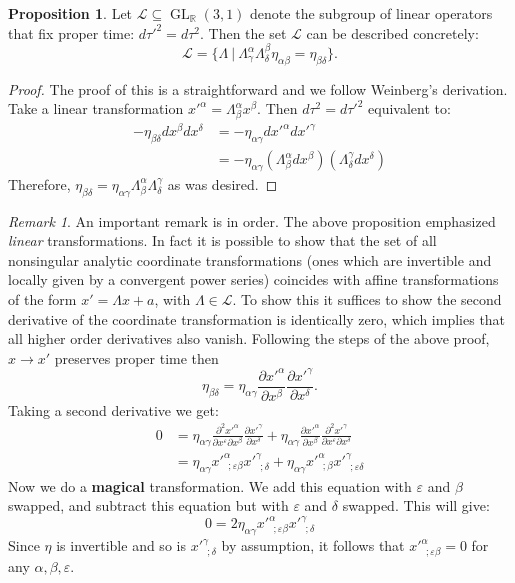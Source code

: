 \documentclass[11pt]{report}
\newcommand{\RR}{\mathbb{R}}
\newcommand{\ms}{\mathscr}
\newcommand{\veps}{\varepsilon}
\newcommand{\FR}[2]{\frac{#1}{#2}}
\newcommand{\PP}[2]{\frac{\di #1}{\di #2}}
\theoremstyle{plain}
\theoremstyle{definition}
\newtheorem{proposition}{Proposition}[section]
\theoremstyle{remark}
\newtheorem{remark}{Remark}[section]
\DeclareMathOperator{\GL}{GL}
\def\seq{\subseteq}
\newcommand{\gam}{\gamma}
\newcommand{\di}{\partial}
\begin{document}
\begin{proposition} Let $\ms L \seq \GL_\RR(3,1)$ denote the subgroup of linear
operators that fix proper time: $d\tau'^2 = d\tau^2$. Then the set $\ms L$ can
be described concretely:
\[ \ms L = \{ \Lambda\ |\ \Lambda^\alpha_\gamma
\Lambda^\beta_\delta\eta_{\alpha\beta} = \eta_{\beta\delta}\}.\]
\end{proposition}
\begin{proof}
The proof of this is a straightforward and we follow Weinberg's derivation.
Take a linear transformation $x'^\alpha = \Lambda^\alpha_\beta x^\beta$.
Then $d\tau^2 = d\tau'^2$ equivalent to:
\begin{align*}
    -\eta_{\beta\delta} dx^\beta dx^\delta
  &=-\eta_{\alpha\gamma} dx'^\alpha dx'^\gamma\\
  &=-\eta_{\alpha\gamma}(\Lambda^\alpha_\beta dx^\beta)
                        (\Lambda^\gamma_\delta dx^\delta)
\end{align*}
Therefore, $\eta_{\beta\delta} = \eta_{\alpha\gamma} \Lambda^\alpha_\beta
\Lambda^\gamma_\delta$ as was desired. 
\end{proof}

\begin{remark}
An important remark is in order. The above proposition emphasized
\emph{linear} transformations. In fact it is possible to show that the set
of all nonsingular analytic coordinate transformations (ones which are
invertible and locally given by a convergent power series) coincides with
affine transformations of the form $x' = \Lambda x + a$, with
$\Lambda\in\ms L$.  To show this it suffices to show the second derivative
of the coordinate transformation is identically zero, which implies that
all higher order derivatives also vanish. Following the steps of the above
proof, $x \to x'$ preserves proper time then \[ \eta_{\beta\delta} =
\eta_{\alpha\gamma} \PP{x'^\alpha}{x^\beta} \PP{x'^\gamma}{x^\delta}.\]
Taking a second derivative we get:
\begin{align*}
0 &= \eta_{\alpha\gamma}\FR{\di^2 x'^\alpha}{\di x^\veps\di x^\beta}
\PP{x'^\gam}{x^\delta} +\eta_{\alpha\gamma}\PP{x'^\alpha}{x^\beta}
\FR{\di^2 x'^\gam}{\di x^\veps\di x^\delta}\\
&= \eta_{\alpha\gam}x'^\alpha_{\ \ ;\veps\beta} x'^\gam_{\ \ ;\delta}
+\eta_{\alpha\gam}x'^\alpha_{\ \ ;\beta} x'^\gam_{\ \ ;\veps\delta}
\end{align*}
Now we do a \textbf{magical} transformation. We add this equation with
$\veps$ and $\beta$ swapped, and subtract this equation but with $\veps$
and $\delta$ swapped. This will give:
\[0=2\eta_{\alpha\gam} x'^\alpha_{\ \ ;\veps\beta}x'^\gam_{\ \ ;\delta}\]
Since $\eta$ is invertible and so is $x'^\gam_{\ \ ;\delta}$ by assumption,
it follows that $x'^\alpha_{\ \ ;\veps\beta} = 0$ for any
$\alpha,\beta,\veps$. 
\end{remark}
\end{document}

